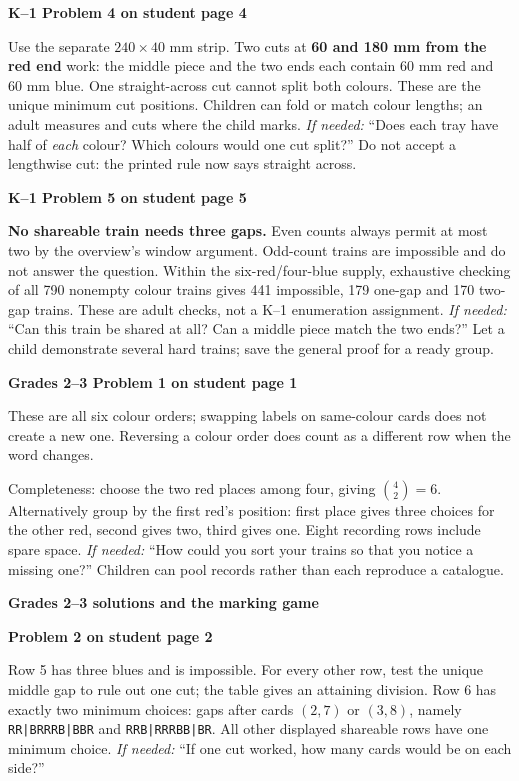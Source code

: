 \documentclass[11pt]{article}
\newcommand{\head}[1]{\par\textbf{\large #1}\par}
\newcommand{\sub}[1]{\par\textbf{#1}\par}
\newcommand{\hint}[1]{\textit{If needed:} #1}
\newcommand{\seq}[1]{\texttt{#1}}
\begin{document}
\sub{K--1 Problem 4 on student page 4}
Use the separate $240\times40$ mm strip. Two cuts at \textbf{60 and 180 mm from the red end} work: the middle piece and the two ends each contain 60 mm red and 60 mm blue. One straight-across cut cannot split both colours. These are the unique minimum cut positions. Children can fold or match colour lengths; an adult measures and cuts where the child marks. \hint{``Does each tray have half of \emph{each} colour? Which colours would one cut split?''} Do not accept a lengthwise cut: the printed rule now says straight across.

\sub{K--1 Problem 5 on student page 5}
\textbf{No shareable train needs three gaps.} Even counts always permit at most two by the overview's window argument. Odd-count trains are impossible and do not answer the question. Within the six-red/four-blue supply, exhaustive checking of all 790 nonempty colour trains gives 441 impossible, 179 one-gap and 170 two-gap trains. These are adult checks, not a K--1 enumeration assignment. \hint{``Can this train be shared at all? Can a middle piece match the two ends?''} Let a child demonstrate several hard trains; save the general proof for a ready group.

\sub{Grades 2--3 Problem 1 on student page 1}
These are all six colour orders; swapping labels on same-colour cards does not create a new one. Reversing a colour order does count as a different row when the word changes.
\begin{center}\allfour\end{center}
Completeness: choose the two red places among four, giving $\binom42=6$. Alternatively group by the first red's position: first place gives three choices for the other red, second gives two, third gives one. Eight recording rows include spare space. \hint{``How could you sort your trains so that you notice a missing one?''} Children can pool records rather than each reproduce a catalogue.
\newpage
\head{Grades 2--3 solutions and the marking game}
\sub{Problem 2 on student page 2}
\begin{center}\msecond\end{center}
Row 5 has three blues and is impossible. For every other row, test the unique middle gap to rule out one cut; the table gives an attaining division. Row 6 has exactly two minimum choices: gaps after cards $(2,7)$ or $(3,8)$, namely \seq{RR|BRRRB|BBR} and \seq{RRB|RRRBB|BR}. All other displayed shareable rows have one minimum choice. \hint{``If one cut worked, how many cards would be on each side?''}
\end{document}
